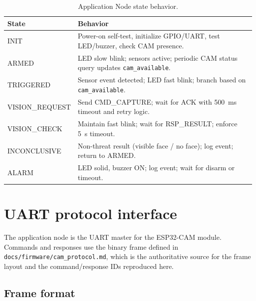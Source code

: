 \documentclass[11pt,a4paper]{article}
\begin{document}
\begin{table}[H]
    \centering
    \caption{Application Node state behavior.}
    \label{tab:states}
    \begin{tabular}{@{}l >{\raggedright\arraybackslash}p{9cm}@{}}
        \toprule
        \textbf{State} & \textbf{Behavior} \\
        \midrule
        INIT & Power-on self-test, initialize GPIO/UART, test LED/buzzer, check CAM presence. \\
        ARMED & LED slow blink; sensors active; periodic CAM status query updates \texttt{cam\_available}. \\
        TRIGGERED & Sensor event detected; LED fast blink; branch based on \texttt{cam\_available}. \\
        VISION\_REQUEST & Send CMD\_CAPTURE; wait for ACK with 500~ms timeout and retry logic. \\
        VISION\_CHECK & Maintain fast blink; wait for RSP\_RESULT; enforce 5~s timeout. \\
        INCONCLUSIVE & Non-threat result (visible face / no face); log event; return to ARMED. \\
        ALARM & LED solid, buzzer ON; log event; wait for disarm or timeout. \\
        \bottomrule
    \end{tabular}
\end{table}

\section{UART protocol interface}
\label{sec:uart}

The application node is the UART master for the ESP32-CAM module.  Commands and
responses use the binary frame defined in \texttt{docs/firmware/cam\_protocol.md},
which is the authoritative source for the frame layout and the command/response
IDs reproduced here.

\subsection{Frame format}

\begin{center}
\end{center}
\end{document}
